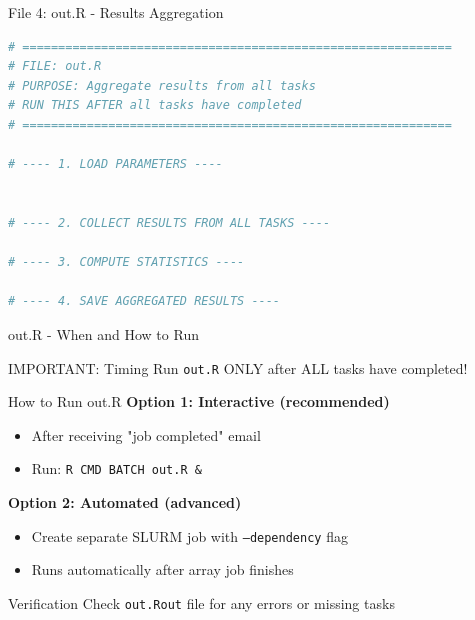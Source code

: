 \documentclass[aspectratio=169]{beamer}
\begin{document}
\begin{frame}[fragile]{File 4: out.R - Results Aggregation}

\begin{lstlisting}[language=R, basicstyle=\ttfamily\scriptsize]
# ============================================================
# FILE: out.R
# PURPOSE: Aggregate results from all tasks
# RUN THIS AFTER all tasks have completed
# ============================================================

# ---- 1. LOAD PARAMETERS ----


# ---- 2. COLLECT RESULTS FROM ALL TASKS ----

# ---- 3. COMPUTE STATISTICS ----

# ---- 4. SAVE AGGREGATED RESULTS ----

\end{lstlisting}
\end{frame}

\begin{frame}{out.R - When and How to Run}
\begin{alertblock}{IMPORTANT: Timing}
Run \texttt{out.R} ONLY after ALL tasks have completed!
\end{alertblock}

\vspace{0.5em}
\begin{block}{How to Run out.R}
\textbf{Option 1: Interactive (recommended)}
\begin{itemize}
    \item After receiving "job completed" email
    \item Run: \texttt{R CMD BATCH out.R \&}
\end{itemize}

\textbf{Option 2: Automated (advanced)}
\begin{itemize}
    \item Create separate SLURM job with \texttt{--dependency} flag
    \item Runs automatically after array job finishes
\end{itemize}
\end{block}

\begin{exampleblock}{Verification}
Check \texttt{out.Rout} file for any errors or missing tasks
\end{exampleblock}
\end{frame}
\end{document}
